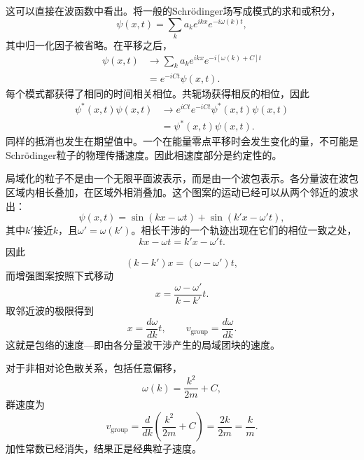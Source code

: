 这可以直接在波函数中看出。将一般的Schr\"odinger场写成模式的求和或积分，
\begin{equation}
\psi(x,t)=\sum_k a_k e^{ikx}e^{-i\omega(k)t},
\end{equation}
其中归一化因子被省略。在平移之后，
\begin{align}
\psi(x,t)
&\longrightarrow
\sum_k a_k e^{ikx}e^{-i[\omega(k)+C]t}
\\
&=e^{-iCt}\psi(x,t).
\end{align}
每个模式都获得了相同的时间相关相位。共轭场获得相反的相位，因此
\begin{equation}
\begin{aligned}
\psi^*(x,t)\psi(x,t)
&\longrightarrow
e^{iCt}e^{-iCt}\psi^*(x,t)\psi(x,t)
\\
&=\psi^*(x,t)\psi(x,t).
\end{aligned}
\end{equation}
同样的抵消也发生在期望值中。一个在能量零点平移时会发生变化的量，不可能是Schr\"odinger粒子的物理传播速度。因此相速度部分是约定性的。

局域化的粒子不是由一个无限平面波表示，而是由一个波包表示。各分量波在波包区域内相长叠加，在区域外相消叠加。这个图案的运动已经可以从两个邻近的波求出：
\begin{equation}
\psi(x,t)=
\sin(kx-\omega t)+
\sin(k'x-\omega't),
\end{equation}
其中\(k'\)接近\(k\)，且\(\omega'=\omega(k')\)。相长干涉的一个轨迹出现在它们的相位一致之处，
\begin{equation}
kx-\omega t=k'x-\omega't.
\end{equation}
因此
\begin{equation}
(k-k')x=(\omega-\omega')t,
\end{equation}
而增强图案按照下式移动
\begin{equation}
x=\frac{\omega-\omega'}{k-k'}t.
\end{equation}
取邻近波的极限得到
\begin{equation}
x=\frac{d\omega}{dk}t,
\qquad
v_{\mathrm{group}}=\frac{d\omega}{dk}.
\end{equation}
这就是包络的速度---即由各分量波干涉产生的局域团块的速度。

对于非相对论色散关系，包括任意偏移，
\begin{equation}
\omega(k)=\frac{k^2}{2m}+C,
\end{equation}
群速度为
\begin{equation}
v_{\mathrm{group}}
=\frac{d}{dk}\left(\frac{k^2}{2m}+C\right)
=\frac{2k}{2m}
=\frac{k}{m}.
\end{equation}
加性常数已经消失，结果正是经典粒子速度。

